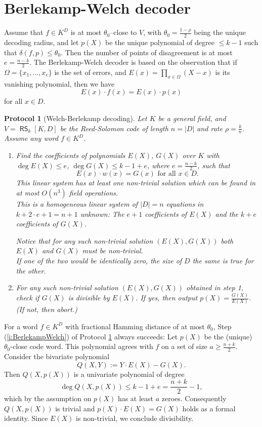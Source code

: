 \documentclass[11pt,article,oneside]{memoir}
\newtheorem{protocol}[]{Protocol}
\theoremstyle{definition}
\theoremstyle{remark}
\DeclareMathOperator{\RS}{\mathsf{RS}}
\begin{document}
\section{Berlekamp-Welch decoder}

Assume that  $f\in K^D$ is at most $\theta_0$--close to $V$, with
$\theta_0 = \frac{1-\rho}{2}$ being the unique decoding radius, 
and let $p(X)$ be the unique polynomial of degree $\leq k-1$ such that $\delta(f,p) \leq \theta_0$. 
Then the number of points of disagreement is at most $e=\frac{n-k}{2}$. 
The Berlekamp-Welch decoder \cite{BerlekampWelch} is based on the observation that if $\Omega =\{x_1,\ldots,x_e\}$ is the set of errors, and $E(x)=\prod_{x\in\Omega} (X-x)$ is its vanishing polynomial, then we have 
\[
E(x)\cdot f(x) = E(x)\cdot p(x)
\]
for all $x\in D$.

\begin{protocol}[Welch-Berlekamp decoding]
\label{p:BerlekampWelch} 
Let $K$ be a general field, and $V=\RS_k[K,D]$ be the Reed-Solomon code  of length $n= |D|$ and rate $\rho = \frac{k}{n}$.  
Assume any word $f\in K^D$. 
\begin{enumerate}
\item 
Find the coefficients of polynomials $E(X)$, $G(X)$ over $K$ with $\deg E(X)\leq e$, $\deg G(X)\leq k-1+e$, where $e=\frac{n-k}{2}$, such that
\[
	E(x)\cdot w(x) = G(x) \text{ for all } x\in D.
\] 
This linear system has at least one non-trivial solution which can be found in at most $O\left(n^3\right)$ field operations.
\\
{\tiny
This is a homogeneous linear system of $|D|=n$ equations in $k+2\cdot e+1=n+1$ unknown: 
The $e+1$ coefficients of $E(X)$ and the $k+e$ coefficients of $G(X)$.
}

Notice that for any such non-trivial solution $(E(X),G(X))$ both $E(X)$ and $G(X)$ must be non-trivial. 
\\
{\tiny
If one of the two would be identically zero, the size of $D$ the same is true for the other.
}

\item
\label{i:BerlekampWelch}
For any such non-trivial solution $(E(X),G(X))$ obtained in step 1, check if $G(X)$ is divisible by $E(X)$. 
If yes, then output $p(X)= \frac{G(X)}{E(X)}$.  
(If not, then abort.)
\end{enumerate}
\end{protocol}

For a word $f\in K^D$ with fractional Hamming distance of at most $\theta_0$, Step (\ref{i:BerlekampWelch}) of Protocol \ref{p:BerlekampWelch} always succeeds: 
Let $p(X)$ be the (unique) $\theta_0$-close code word. 
This polynomial agrees with $f$ on a set of size $a\geq\frac{n+k}{2}$. 
Consider the bivariate polynomial
\[
Q(X,Y):= Y\cdot E(X)-G(X). 
\]
Then $Q(X,p(X))$ is a univariate polynomial of degree 
\[
\deg Q(X,p(X)) \leq k-1+e =\frac{n+k}{2} - 1,
\] 
which by the assumption on $p(X)$ has at least $a$ zeroes. 
Consequently $Q(X,p(X))$ is trivial and $p(X)\cdot E(X)=G(X)$ holds as a formal identity. 
Since $E(X)$ is non-trivial, we conclude divisibility. 
\end{document}
